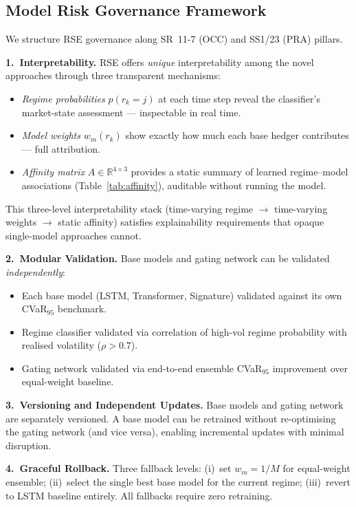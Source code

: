 \documentclass[11pt]{article}
\newcommand{\R}{\mathbb{R}}
\begin{document}
\subsection{Model Risk Governance Framework}

We structure RSE governance along SR~11-7 (OCC) and SS1/23 (PRA) pillars.

\textbf{1.\ Interpretability.}
RSE offers \emph{unique} interpretability among the novel approaches through three transparent mechanisms:
\begin{itemize}[noitemsep]
    \item \textit{Regime probabilities} $p(r_k=j)$ at each time step reveal the classifier's market-state assessment --- inspectable in real time.
    \item \textit{Model weights} $w_m(r_k)$ show exactly how much each base hedger contributes --- full attribution.
    \item \textit{Affinity matrix} $A \in \R^{4 \times 3}$ provides a static summary of learned regime--model associations (Table~\ref{tab:affinity}), auditable without running the model.
\end{itemize}
This three-level interpretability stack (time-varying regime $\to$ time-varying weights $\to$ static affinity) satisfies explainability requirements that opaque single-model approaches cannot.

\textbf{2.\ Modular Validation.}
Base models and gating network can be validated \emph{independently}:
\begin{itemize}[noitemsep]
    \item Each base model (LSTM, Transformer, Signature) validated against its own CVaR$_{95}$ benchmark.
    \item Regime classifier validated via correlation of high-vol regime probability with realised volatility ($\rho > 0.7$).
    \item Gating network validated via end-to-end ensemble CVaR$_{95}$ improvement over equal-weight baseline.
\end{itemize}

\textbf{3.\ Versioning and Independent Updates.}
Base models and gating network are separately versioned.  A base model can be retrained without re-optimising the gating network (and vice versa), enabling incremental updates with minimal disruption.

\textbf{4.\ Graceful Rollback.}
Three fallback levels: (i)~set $w_m = 1/M$ for equal-weight ensemble; (ii)~select the single best base model for the current regime; (iii)~revert to LSTM baseline entirely.  All fallbacks require zero retraining.
\end{document}
